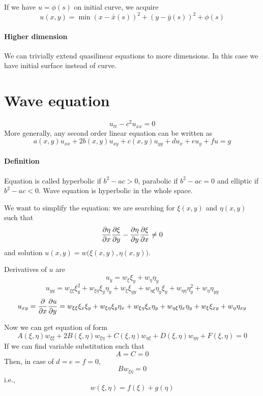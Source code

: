 If we have $u=\phi(s)$ on initial curve, we acquire
$$u(x,y) = \min (x-\bar{x}(s))^2 + (y-\bar{y}(s))^2 + \phi(s)$$

\paragraph{Higher dimension}
We can trivially extend quasilinear equations to more dimensions. In this case we have initial surface instead of curve.
\section{Wave equation}
$$u_{tt} -c^2u_{xx} = 0$$
More generally, any second order linear equation can be written as
$$a(x,y) u_{xx} + 2b(x,y) u_{xy} + c(x,y) u_{yy} + du_x + eu_y + fu = g$$

\paragraph{Definition}
Equation is called hyperbolic if $b^2-ac>0$, parabolic if  $b^2-ac=0$ and elliptic if  $b^2-ac<0$. Wave equation is hyperbolic in the whole space.

We want to simplify the equation: we are searching for $\xi(x,y)$ and $\eta(x,y)$ such that
$$\pdv{\eta}{x} \pdv{\xi}{y} - \pdv{\eta}{y} \pdv{\xi}{x} \neq 0$$
and solution $u(x,y) = w\big(\xi(x,y), \eta(x,y)\big)$.

Derivatives of $u$ are
$$u_y = w_\xi \xi_y + w_\eta \eta_y$$
$$u_{yy} = w_{\xi\xi} \xi_{y}^2 + w_{\xi\eta}\xi_y\eta_y + w_{\xi}\xi_{yy} + w_{\eta \xi}\eta_y\xi_y + w_{\eta\eta} \eta_{y}^2+ w_{\eta}\eta_{yy}  $$
$$u_{xy} =\pdv{x}\pdv{u}{y} = w_{\xi \xi} \xi_x\xi_y + w_{\xi\eta}\xi_y\eta_x + w_{\xi\eta}\xi_x\eta_y + w_{\eta \xi} \eta_x\eta_y + w_{\xi}\xi_{xy}+w_\eta\eta_{xy}$$

Now we can get equation of form
$$A(\xi,\eta) w_{\xi\xi} + 2B(\xi,\eta) w_{\xi\eta} + C(\xi,\eta) w_{\eta \xi} + D(\xi,\eta) w_{\eta\eta}+ F(\xi,\eta) = 0$$
If we can find variable substitution such that
$$A=C=0$$
Then, in case of $d=e=f=0$,
$$Bw_{\xi\eta} = 0$$
i.e.,
$$w(\xi,\eta) = f(\xi)+g(\eta)$$